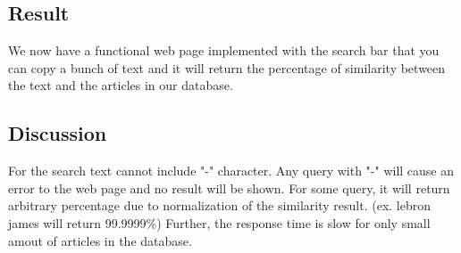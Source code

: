 \subsection{Result}
We now have a functional web page implemented with the  search bar that you can copy a bunch of text and it will return the percentage of similarity between the text and the articles in our database. 

\subsection{Discussion}
For the search text cannot include "-" character. Any query with "-" will cause an error to the web page and no result will be shown. For some query, it will return arbitrary percentage due to normalization of the similarity result. (ex. lebron james will return 99.9999\%)
Further, the response time is slow for only small amout of articles in the database.